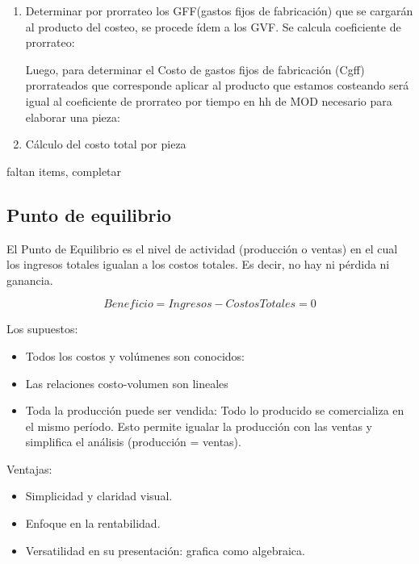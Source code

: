 \documentclass[a4paper,oneside,11pt]{article}
\begin{document}
\begin{enumerate}
    \begin{equation}
        Costo GVF/pieza= Kgvf * tiempo en hh de MOD/pieza
    \end{equation}

    \item Determinar por prorrateo los GFF(gastos fijos de fabricación) que se cargarán al producto del costeo, se procede ídem a los GVF. Se calcula coeficiente de prorrateo:
    

    Luego, para determinar el Costo de gastos fijos de fabricación (Cgff) prorrateados que corresponde aplicar al producto que estamos costeando será igual al coeficiente de prorrateo por tiempo en hh de MOD necesario para elaborar una pieza:
    
    \item Cálculo del costo total por pieza
\end{enumerate}

faltan items, completar

\subsection{Punto de equilibrio}

El Punto de Equilibrio es el nivel de actividad (producción o ventas) en el cual los ingresos totales igualan a los costos totales. Es decir, no hay ni pérdida ni ganancia.

\begin{equation}
    Beneficio = Ingresos - Costos Totales = 0
\end{equation}

Los supuestos:
\begin{itemize}
    \item Todos los costos y volúmenes son conocidos:
    \item Las relaciones costo-volumen son lineales
    \item Toda la producción puede ser vendida: Todo lo producido se comercializa en el mismo período. Esto permite igualar la producción con las ventas y simplifica el análisis (producción = ventas).
\end{itemize}

Ventajas:
\begin{itemize}
    \item Simplicidad y claridad visual.
    \item Enfoque en la rentabilidad.
    \item Versatilidad en su presentación: grafica como algebraica.
\end{itemize}
\end{document}
